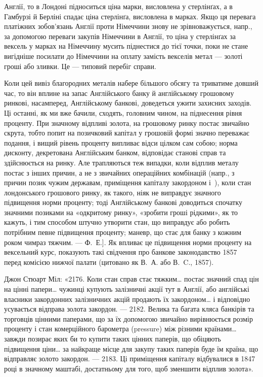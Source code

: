 \parcont{}  %
Англії, то в Лондоні підноситься ціна марки, висловлена у стерлінґах, а в Гамбурзі
й Берліні спадає ціна стерлінґа, висловлена в марках. Якщо ця перевага
платіжних зобов’язань Англії проти Німеччини знову не зрівноважується, напр.,
за допомогою переваги закупів Німеччини в Англії, то ціна у стерлінґах за
вексель у марках на Німеччину мусить піднестися до тієї точки, поки не стане
вигідніше посилати до Німеччини на оплату замість векселів метал — золоті гроші
або зливки. Це — типовий перебіг справи.

Коли цей вивіз благородних металів набере більшого обсягу та триватиме
довший час, то він вплине на запас Англійського банку й англійському грошовому
ринкові, насамперед, Англійському банкові, доведеться ужити захисних заходів.
Ці останні, як ми вже бачили, сходять, головним чином, на піднесення
рівня проценту. При значному відпливі золота, на грошовому ринку постає звичайно
скрута, тобто попит на позичковий капітал у грошовій формі значно
переважає подання, і вищий рівень проценту випливає відси цілком сам собою;
норма дисконту, декретована Англійським банком, відповідає станові справ та
здійснюється на ринку. Але трапляються теж випадки, коли відплив металу
постає з інших причин, а не з звичайних операційних комбінацій (напр., з причин
позик чужим державам, приміщення капіталу закордоном і~), коли стан
лондонського грошового ринку, як такого, ніяк не виправдує значного підвищення
норми проценту; тоді Англійському банкові доводиться спочатку значними
позиками на «одкритому ринку», «зробити гроші рідкими», як то кажуть, і тим
способом штучно утворити стан, що виправдує або робить потрібним певне підвищення
проценту; маневр, що стає для банку з кожним роком чимраз тяжчим. —
Ф.~Е.]. Як впливає це підвищення норми проценту на вексельний курс, показують
такі свідчення про банкове законодавство 1857~ перед комісією нижчої
палати (цитовано як В.~А. або В.~C., 1857).

Джон Стюарт Міл: «2176. Коли стан справ стає тяжким\dots{} постає значний
спад цін на цінні папери\dots{} чужинці купують залізничні акції тут в Англії,
або англійські власники закордонних залізничних акцій продають їх закордоном\dots{}
і відповідно усувається відправа золота закордон. — 2182. Велика та багата
кляса банкірів та торговців цінними паперами, що за їх допомогою звичайно
вирівнюється розмір проценту і стан комерційного барометра (pressure) між
різними країнами\dots{} завжди позирає яких би то купити таких цінних паперів,
що обіцяють підвищення ціни\dots{} за найкраще місце для закупу таких
паперів буде їм країна, що відправляє золото закордон. — 2183. Ці приміщення
капіталу відбувалися в 1847 році в значному маштабі, достатньому для того, щоб
зменшити відплив золота».

